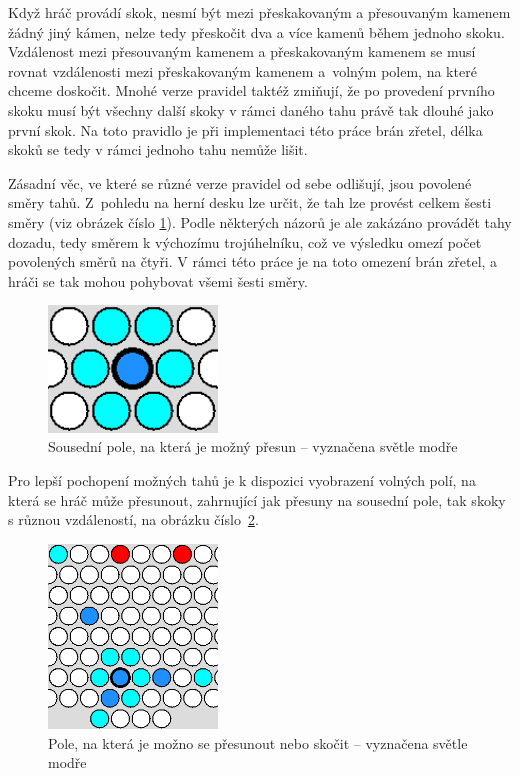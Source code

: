 Když hráč provádí skok, nesmí být mezi přeskakovaným a přesouvaným kamenem žádný jiný kámen, nelze tedy přeskočit dva a více kamenů během jednoho skoku. Vzdálenost mezi přesouvaným kamenem a přeskakovaným kamenem se musí rovnat vzdálenosti mezi přeskakovaným kamenem a~volným polem, na které chceme doskočit. Mnohé verze pravidel taktéž zmiňují, že po provedení prvního skoku musí být všechny další skoky v rámci daného tahu právě tak dlouhé jako první skok. Na toto pravidlo je při implementaci této práce brán zřetel, délka skoků se tedy v rámci jednoho tahu nemůže lišit.

Zásadní věc, ve které se různé verze pravidel od sebe odlišují, jsou povolené směry tahů. Z~pohledu na herní desku lze určit, že tah lze provést celkem šesti směry (viz obrázek číslo \ref{fig:MozneTahy - Sousedni}). Podle některých názorů je ale zakázáno provádět tahy dozadu, tedy směrem k výchozímu trojúhelníku, což ve výsledku omezí počet povolených směrů na čtyři. V rámci této práce je na toto omezení brán zřetel, a hráči se tak mohou pohybovat všemi šesti směry.

\begin{figure}
	\centering
	\includegraphics[width=0.4\textwidth]{Figures/MozneTahy - Sousedni.png}
	\caption[Sousední pole, na která je možný přesun]{Sousední pole, na která je možný přesun -- vyznačena světle modře}
    \label{fig:MozneTahy - Sousedni}
\end{figure}

Pro lepší pochopení možných tahů je k dispozici vyobrazení volných polí, na která se hráč může přesunout, zahrnující jak přesuny na sousední pole, tak skoky s různou vzdáleností, na obrázku číslo~\ref{fig:MozneTahy - Skoky}.

\begin{figure}
	\centering
	\includegraphics[width=0.4\textwidth]{Figures/MozneTahy - Skoky.png}
	\caption[Pole, na která je možno se přesunout nebo skočit]{Pole, na která je možno se přesunout nebo skočit -- vyznačena světle modře}
    \label{fig:MozneTahy - Skoky}
\end{figure}

